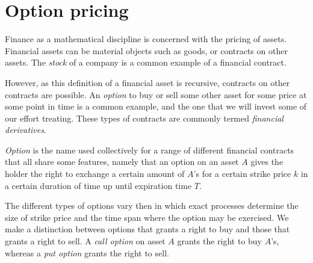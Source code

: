\section{Option pricing}

Finance as a mathematical discipline is concerned with the pricing of assets.
Financial assets can be material objects such as goods, or contracts on other
assets. The \emph{stock} of a company is a common example of a financial contract.

However, as this definition of a financial asset is recursive, contracts on
other contracts are possible. An \emph{option} to buy or sell some other asset
for some price at some point in time is a common example, and the one that we
will invest some of our effort treating. These types of contracts are commonly
termed \emph{financial derivatives}.

\emph{Option} is the name used collectively for a range of different financial
contracts that all share some features, namely that an option on an asset $A$
gives the holder the right to exchange a certain amount of $A$'s for a certain
strike price $k$ in a certain duration of time up until expiration time $T$.

The different types of options vary then in which exact processes determine the
size of strike price and the time span where the option may be exercised.
We make a distinction between options that grants a right to buy and those that
grants a right to sell. A \emph{call option} on asset $A$ grants the right to
buy $A$'s, whereas a \emph{put option} grants the right to sell.

